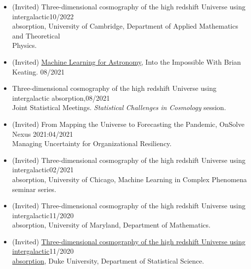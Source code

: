 \documentclass[letterpaper,10pt]{article}
\begin{document}
\begin{itemize}[itemsep=0.25cm, leftmargin=0cm, rightmargin=0cm]
\item[] (Invited) Three-dimensional cosmography of the high redshift Universe using intergalactic\hspace*{\fill}10/2022\\ absorption, University of Cambridge, Department of Applied Mathematics and Theoretical\\ Physics.
\item[] (Invited) \href{https://www.youtube.com/watch?v=jpD_4S7Wi3E&t=2123s}{Machine Learning for Astronomy}, {Into the Impossible With Brian Keating}. \hspace*{\fill}08/2021
\item[] Three-dimensional cosmography of the high redshift Universe using intergalactic absorption,\hspace*{\fill}08/2021\\ Joint Statistical Meetings. {\it Statistical Challenges in Cosmology} session.
\item[] (Invited) From Mapping the Universe to Forecasting the Pandemic, OnSolve Nexus 2021:\hspace*{\fill}04/2021\\Managing Uncertainty for Organizational Resiliency.
\item[] (Invited) Three-dimensional cosmography of the high redshift Universe using intergalactic\hspace*{\fill}02/2021\\  absorption, University of Chicago, Machine Learning in Complex Phenomena seminar series.
\item[] (Invited) Three-dimensional cosmography of the high redshift Universe using intergalactic\hspace*{\fill}11/2020\\  absorption, University of Maryland, Department of Mathematics.
\item[] (Invited) \href{https://youtu.be/Yi0z688goqs}{Three-dimensional cosmography of the high redshift Universe using intergalactic}\hspace*{\fill}11/2020\\  \href{https://youtu.be/89vjQxVIDpI}{absorption}, Duke University, Department of Statistical Science.

\end{itemize}
\end{document}
